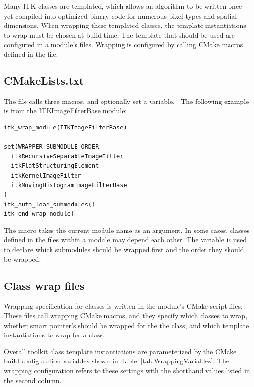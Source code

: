 Many ITK classes are templated, which allows an algorithm to be written once
yet compiled into optimized binary code for numerous pixel types and
spatial dimensions. When wrapping these templated classes, the template
instantiations to wrap must be chosen at build time. The template
that should be used are configured in a module's  files.
Wrapping is configured by calling CMake macros defined in the
 file.


\subsection{CMakeLists.txt}

The  file calls three macros, and
optionally set a variable, . The following
example is from the ITKImageFilterBase module:

\begin{verbatim}
itk_wrap_module(ITKImageFilterBase)

set(WRAPPER_SUBMODULE_ORDER
  itkRecursiveSeparableImageFilter
  itkFlatStructuringElement
  itkKernelImageFilter
  itkMovingHistogramImageFilterBase
)
itk_auto_load_submodules()
itk_end_wrap_module()
\end{verbatim}

The  macro takes the current module name as an argument. In
some cases, classes defined in the  files within a module may depend
each other. The  variable is used to declare
which submodules should be wrapped first and the order they should be
wrapped.


\subsection{Class wrap files}%
\label{subsec:ClassWrapFiles}

Wrapping specification for classes is written in the module's 
CMake script files. These files call wrapping CMake macros, and they specify
which classes to wrap, whether smart pointer's should be wrapped for the the
class, and which template instantiations to wrap for a class.

Overall toolkit class template instantiations are parameterized by the CMake
build configuration variables shown in Table~\ref{tab:WrappingVariables}.
The wrapping configuration refers to these settings with the shorthand values
listed in the second column.


